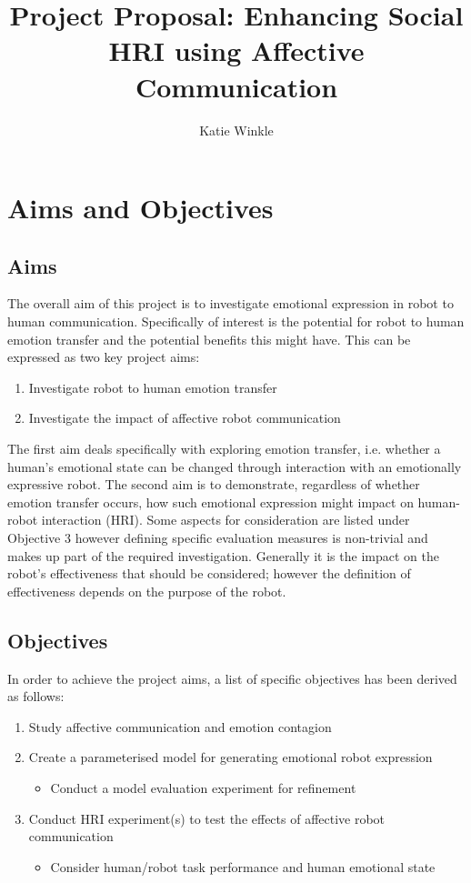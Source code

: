 \documentclass[11pt]{article}
\title{Project Proposal: Enhancing Social HRI using Affective Communication}
\author{Katie Winkle}
\begin{document}
\maketitle

\section{Aims and Objectives}
\subsection{Aims}
The overall aim of this project is to investigate emotional expression in robot to human communication. Specifically of interest is the potential for robot to human emotion transfer and the potential benefits this might have. This can be expressed as two key project aims:

\begin{enumerate}
\item Investigate robot to human emotion transfer
\item Investigate the impact of affective robot communication
\end{enumerate}

The first aim deals specifically with exploring emotion transfer, i.e. whether a human's emotional state can be changed through interaction with an emotionally expressive robot. The second aim is to demonstrate, regardless of whether emotion transfer occurs, how such emotional expression might impact on human-robot interaction (HRI). Some aspects for consideration are listed under Objective 3 however defining specific evaluation measures is non-trivial and makes up part of the required investigation. Generally it is the impact on the robot's effectiveness that should be considered; however the definition of effectiveness depends on the purpose of the robot. 

\subsection{Objectives}
In order to achieve the project aims, a list of specific objectives has been derived as follows: 
\begin{enumerate}
\item Study affective communication and emotion contagion
\item Create a parameterised model for generating emotional robot expression
\begin{itemize}
\item Conduct a model evaluation experiment for refinement
\end{itemize}
\item Conduct HRI experiment(s) to test the effects of affective robot communication
\begin{itemize}
\item Consider human/robot task performance and human emotional state
\end{itemize}
\end{enumerate}
\end{document}

